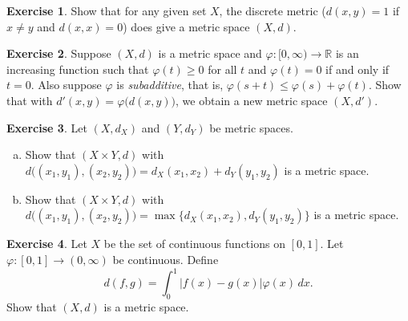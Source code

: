 \documentclass[12pt,openany]{book}
\newcommand{\babs}[1]{\bigl\lvert {#1} \bigr\rvert}
\newcommand{\R}{{\mathbb{R}}}
\newcommand{\myindex}[1]{#1\index{#1}}
\theoremstyle{plain}
\theoremstyle{remark}
\theoremstyle{definition}
\newenvironment{exbox}{%
    \def\FrameCommand{\vrule width 1pt \relax\hspace{10pt}}%
    \MakeFramed{\advance\hsize-\width\FrameRestore}%
}{%
    \endMakeFramed
}
\newenvironment{exparts}{%
    \leavevmode\begin{enumerate}[a),noitemsep,topsep=0pt,parsep=0pt,partopsep=0pt]
}{%
    \end{enumerate}
}
\theoremstyle{exercise}
\newtheorem{exercise}{Exercise}[section]
\theoremstyle{example}
\begin{document}
\begin{exbox}
\begin{exercise}
Show that for any given set $X$, the discrete metric
($d(x,y) = 1$ if $x \neq y$ and $d(x,x) = 0$)
does give a metric space $(X,d)$.
\end{exercise}

\begin{exercise}
Suppose $(X,d)$ is a metric space and
$\varphi \colon [0,\infty) \to \R$ is
an increasing function such that 
$\varphi(t) \geq 0$ for all $t$ and $\varphi(t) = 0$ if and only if
$t=0$.  Also suppose $\varphi$ is \emph{\myindex{subadditive}},
that is, $\varphi(s+t) \leq \varphi(s)+\varphi(t)$.
Show that with $d'(x,y) = \varphi\bigl(d(x,y)\bigr)$, we obtain a new
metric space $(X,d')$.
\end{exercise}

\begin{exercise} \label{exercise:mscross}
Let $(X,d_X)$ and $(Y,d_Y)$ be metric spaces.
\begin{exparts}
\item
Show that $(X \times Y,d)$ with
$d\bigl( (x_1,y_1), (x_2,y_2) \bigr) = d_X(x_1,x_2) + d_Y(y_1,y_2)$ is
a metric space.
\item
Show that $(X \times Y,d)$ with
$d\bigl( (x_1,y_1), (x_2,y_2) \bigr) = \max \{ d_X(x_1,x_2) , d_Y(y_1,y_2) \}$ is
a metric space.
\end{exparts}
\end{exercise}

\begin{exercise}
Let $X$ be the set of continuous functions on $[0,1]$.  Let $\varphi \colon
[0,1] \to (0,\infty)$ be continuous.  Define
\begin{equation*}
d(f,g) = \int_0^1 \babs{f(x)-g(x)}\varphi(x)\,dx .
\end{equation*}
Show that $(X,d)$ is a metric space.
\end{exercise}


\end{exbox}
\end{document}

